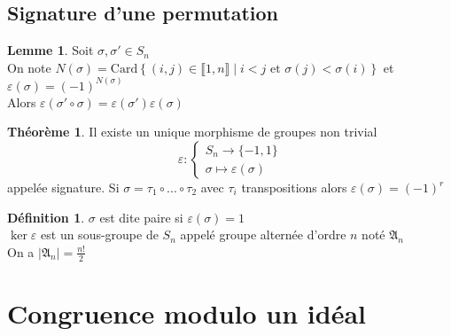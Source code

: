 \documentclass[10pt,a4paper]{article}
\theoremstyle{definition}
\newtheorem{theorem}[proposition]{Théorème}
\newtheorem{lemme}[proposition]{Lemme}
\newtheorem{definition}[proposition]{Définition}
\begin{document}
\pagebreak

\subsection{Signature d'une permutation}
\begin{lemme}
Soit $\sigma, \sigma' \in S_n$ \\
On note $N(\sigma) = \text{Card} \left\{ (i, j) \in \llbracket 1, n \rrbracket \mid i < j \text{ et } \sigma(j) < \sigma(i) \right\}$ et $\varepsilon(\sigma) = (-1)^{N(\sigma)}$ \\
Alors $\varepsilon(\sigma' \circ \sigma) = \varepsilon(\sigma') \varepsilon(\sigma)$
\end{lemme}
\begin{theorem}
Il existe un unique morphisme de groupes non trivial
\[ \varepsilon: \begin{cases}
S_n \to \{ -1, 1 \} \\
\sigma \mapsto \varepsilon(\sigma)
\end{cases} \]
appelée signature. Si $\sigma = \tau_1 \circ ... \circ \tau_2$ avec $\tau_i$ transpositions alors $\varepsilon(\sigma) = (-1)^{r}$
\end{theorem}
\begin{definition}
$\sigma$ est dite paire si $\varepsilon(\sigma) = 1$ \\
$\ker \varepsilon$ est un sous-groupe de $S_n$ appelé groupe alternée d'ordre $n$ noté $\mathfrak{A}_n$ \\
On a $| \mathfrak{A}_n | = \frac{n!}{2}$
\end{definition}

\section{Congruence modulo un idéal}
\end{document}
